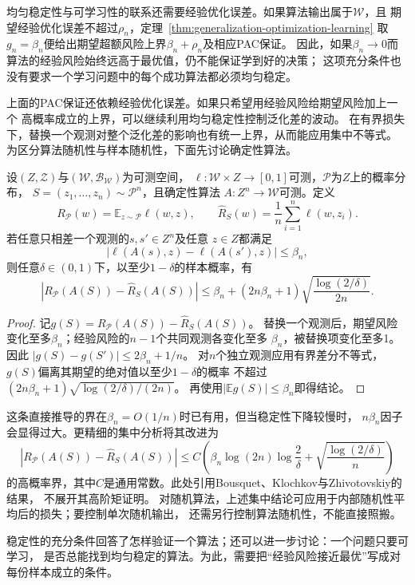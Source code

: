 均匀稳定性与可学习性的联系还需要经验优化误差。如果算法输出属于$\mathcal W$，且
期望经验优化误差不超过$\rho_n$，定理~\ref{thm:generalization-optimization-learning}
取$g_n=\beta_n$便给出期望超额风险上界$\beta_n+\rho_n$及相应PAC保证。
因此，如果$\beta_n\to0$而算法的经验风险始终远高于最优值，仍不能保证学到好的决策；
这项充分条件也没有要求一个学习问题中的每个成功算法都必须均匀稳定。

上面的PAC保证还依赖经验优化误差。如果只希望用经验风险给期望风险加上一个
高概率成立的上界，可以继续利用均匀稳定性控制泛化差的波动。
在有界损失下，替换一个观测对整个泛化差的影响也有统一上界，从而能应用集中不等式。
为区分算法随机性与样本随机性，下面先讨论确定性算法。

\begin{theorem}[均匀稳定性的高概率泛化界]
\label{thm:stability-high-probability}
设$(Z,\mathcal Z)$与$(\mathcal W,\mathcal B_{\mathcal W})$为可测空间，
$\ell:\mathcal W\times Z\to[0,1]$可测，$\mathcal P$为$Z$上的概率分布，
$S=(z_1,\ldots,z_n)\sim\mathcal P^n$，且确定性算法
$A:Z^n\to\mathcal W$可测。定义
\[
 R_{\mathcal P}(w)=\mathbb E_{z\sim\mathcal P}\ell(w,z),
 \qquad
 \hat R_S(w)=\frac1n\sum_{i=1}^n\ell(w,z_i).
\]
若任意只相差一个观测的$s,s'\in Z^n$及任意
$z\in Z$都满足
\[
 |\ell(A(s),z)-\ell(A(s'),z)|\leq\beta_n,
\]
则任意$\delta\in(0,1)$下，以至少$1-\delta$的样本概率，有
\[
 |R_{\mathcal P}(A(S))-\hat R_S(A(S))|
 \leq\beta_n+(2n\beta_n+1)\sqrt{\frac{\log(2/\delta)}{2n}}.
\]
\end{theorem}
\begin{proof}
记$g(S)=R_{\mathcal P}(A(S))-\hat R_S(A(S))$。
替换一个观测后，期望风险变化至多$\beta_n$；经验风险的$n-1$个共同观测各变化至多
$\beta_n$，被替换项变化至多1。因此
$|g(S)-g(S')|\leq2\beta_n+1/n$。
对$n$个独立观测应用有界差分不等式，$g(S)$偏离其期望的绝对值以至少$1-\delta$的概率
不超过$(2n\beta_n+1)\sqrt{\log(2/\delta)/(2n)}$。
再使用$|\mathbb E g(S)|\leq\beta_n$即得结论。
\end{proof}

这条直接推导的界在$\beta_n=O(1/n)$时已有用，但当稳定性下降较慢时，
$n\beta_n$因子会显得过大。更精细的集中分析将其改进为
\[
 |R_{\mathcal P}(A(S))-\hat R_S(A(S))|
 \leq C\!\left(\beta_n\log(2n)\log\frac2\delta
          +\sqrt{\frac{\log(2/\delta)}n}\right)
\]
的高概率界，其中$C$是通用常数。此处引用Bousquet、Klochkov与Zhivotovskiy的结果，
不展开其高阶矩证明。
对随机算法，上述集中结论可应用于内部随机性平均后的损失；要控制单次随机输出，
还需另行控制算法随机性，不能直接照搬。

稳定性的充分条件回答了怎样验证一个算法；还可以进一步讨论：一个问题只要可学习，
是否总能找到均匀稳定的算法。为此，需要把“经验风险接近最优”写成对每份样本成立的条件。

